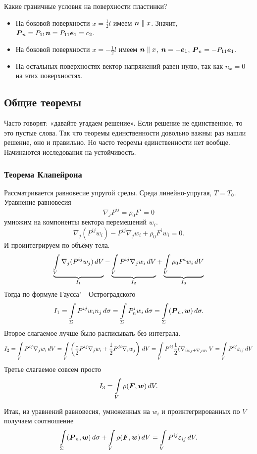 Какие граничные условия на поверхности пластинки?
\begin{itemize}
\item На боковой поверхности $x=\frac12l$ имеем $\boldsymbol{n}\parallel x$. Значит, $\boldsymbol{P}_n = P_{11}\boldsymbol{n} = P_{11}\boldsymbol{e}_1 = c_2$.

\item 
На боковой поверхности $x = -\frac12l$ имеем $\boldsymbol{n}\parallel x$, $\boldsymbol{n} = -\boldsymbol{e}_1$, $\boldsymbol{P}_n = -P_{11}\boldsymbol{e}_1$.
\item На остальных поверхностях вектор напряжений равен нулю, так как $n_x=0$ на этих поверхностях.
\end{itemize}

\subsection{Общие теоремы}
Часто говорят: «давайте угадаем решение». Если решение не единственное, то это пустые слова. Так что теоремы единственности довольно важны: раз нашли решение, оно и правильно.
Но часто теоремы единственности нет вообще. Начинаются исследования на устойчивость.
\subsubsection{Теорема Клапейрона}
  Рассматривается равновесие упругой среды. Среда линейно-упругая, $T=T_0$. Уравнение равновесия 
\[
  \nabla_j P^{ij} = \rho_0 F^i = 0
\]
умножим на компоненты вектора перемещений $w_i$.
\[
  \nabla_j (P^{ij} w_i) - P^{ij}\nabla_j w_i + \rho_0 F^i w_i = 0.
\]
И проинтегрируем по объёму тела.
\[
  \underbrace{\int\limits_V \nabla_j (P^{ij}w_j)\,dV}_{I_1}
 - \underbrace{\int\limits_V P^{ij} \nabla_j w_i\,dV}_{I_2}
 + \underbrace{\int\limits_{V} \rho_0 F^i w_i\,dV}_{I_3}
\]
Тогда по формуле Гаусса"--~Остроградского
\[
 I_1 = \int\limits_{\Sigma} P^{ij} w_i n_j\,d\sigma = \int\limits_{\Sigma} P^i_n w_i\,d\sigma = 
  \int\limits_{\Sigma}(\boldsymbol{P}_n,\boldsymbol{w})\,d\sigma.
\]
Второе слагаемое лучше было расписывать без интеграла.
\[
  I_2 = \int\limits_{V} P^{ij}\nabla_j w_i\,dV =
   \int\limits_{V}\left( \frac12 P^{ij}\nabla_j w_i + \frac12 P^{ji} \nabla_i w_j \right)\,dV = 
   \int\limits_{V} P^{ij}\frac12 (\nabla_{i w_j + \nabla_j w_i}\,V = \int\limits_{V} P^{ij}\varepsilon_{ij}\,dV
\]
Третье слагаемое совсем просто
\[
  I_3 = \int\limits_{V}\rho (\boldsymbol{F},\boldsymbol{w})\,dV.
\]

Итак, из уравнений равновесия, умноженных на $w_i$ и проинтегрированных по $V$ получаем соотношение
\begin{equation}\label{prekla}
  \int\limits_{\Sigma}(\boldsymbol{P}_n,\boldsymbol{w})\,d\sigma + \int\limits_{V} \rho(\boldsymbol{F},\boldsymbol{w})\,dV = \int\limits_{V}P^{ij}\varepsilon_{ij}\,dV.
\end{equation}

